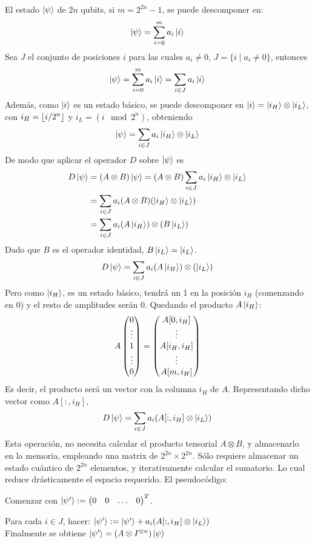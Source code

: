 \begin{ejemplo}
El estado $\ket{\psi}$ de $2n$ qubits, si $m = 2^{2n}-1$, se puede descomponer 
en:
$$ \ket{\psi} = \sum_{i = 0}^{m} a_i \ket{i} $$
Sea $J$ el conjunto de posiciones $i$ para las cuales $a_i \neq 0$, $ J = \{ i 
\mid a_i \neq 0\}$, entonces
$$ \ket{\psi} = \sum_{i = 0}^{m} a_i \ket{i} = \sum_{i \in J} a_i \ket{i} $$
Además, como $\ket{i}$ es un estado básico, se puede descomponer en $\ket{i} = 
\ket{i_H} \otimes \ket{i_L}$, con $i_H=\lfloor i/2^n \rfloor$ y $i_L = (i \mod 2^n)$, 
obteniendo
$$ \ket{\psi} = \sum_{i \in J} a_i \ket{i_H} \otimes \ket{i_L}$$
De modo que aplicar el operador $D$ sobre $\ket{\psi}$ es
\begin{equation}
\begin{split}
D \ket{\psi} &= (A \otimes B) \ket{\psi} = (A \otimes B) \sum_{i \in J} a_i 
\ket{i_H} \otimes \ket{i_L} \\
	&= \sum_{i \in J} a_i (A \otimes B) (\ket{i_H} \otimes \ket{i_L})\\
	&= \sum_{i \in J} a_i (A \ket{i_H}) \otimes (B \ket{i_L})\\
\end{split}
\end{equation}
Dado que $B$ es el operador identidad, $B\ket{i_L} = \ket{i_L}$.
$$ D \ket{\psi} = \sum_{i \in J} a_i (A \ket{i_H}) \otimes (\ket{i_L}) $$
Pero como $\ket{i_H}$, es un estado básico, tendrá un 1 en la posición $i_H$ 
(comenzando en 0) y el resto de amplitudes serán 0. Quedando el producto $A 
\ket{i_H}$:
$$
A \begin{pmatrix} 0 \\ \vdots \\ 1  \\ \vdots\\ 0 \end{pmatrix} =
\begin{pmatrix} A[0,i_H] \\ \vdots \\ A[i_H,i_H] \\ \vdots \\ A[m, i_H] \end{pmatrix}
$$
Es decir, el producto será un vector con la columna $i_H$ de $A$. Representando 
dicho vector como $A[:, i_H]$,
$$
D \ket{\psi} = \sum_{i \in J} a_i (A[:, i_H] \otimes \ket{i_L})
$$
Esta operación, no necesita calcular el producto tensorial $A\otimes B$, y 
almacenarlo en la memoria, empleando una matrix de $2^{2n} \times 2^{2n}$. Sólo 
requiere almacenar un estado cuántico de $2^{2n}$ elementos, y iterativamente 
calcular el sumatorio. Lo cual reduce drásticamente el espacio requerido. El 
pseudocódigo:

Comenzar con $\ket{\psi'} := \begin{pmatrix} 0 & 0 & \ldots & 0 \end{pmatrix}^T$.

Para cada $i \in J$, hacer: $\ket{\psi'} := \ket{\psi'} + a_i (A[:, i_H] \otimes 
\ket{i_L})$
\\
\noindent
Finalmente se obtiene $\ket{\psi'} = (A \otimes I^{\otimes n}) \ket{\psi}$


\end{ejemplo}
